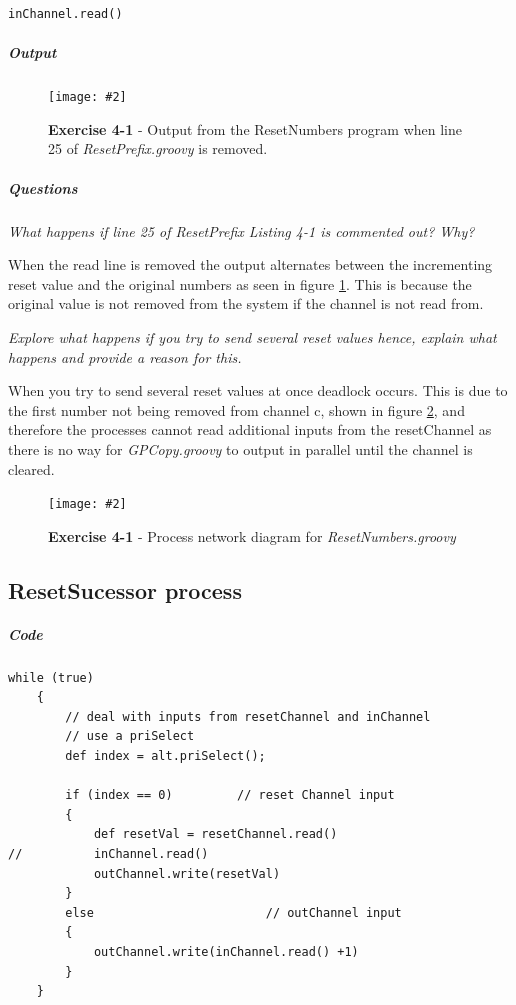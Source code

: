 \documentclass[10pt, a4paper]{article}
\newcommand{\figuremacro}[5]{
    \begin{figure}[#1]
        \centering
        \texttt{[image: \#2]}
        \caption[#3]{\textbf{#3}#4}
        \label{fig:#2}
    \end{figure}
}
\begin{document}
	\begin{lstlisting}[caption = "Line 25 of ResetPrefix.groovy"]
		inChannel.read()	\end{lstlisting}
		
	\subparagraph{Output} \hfill
	
	\figuremacro{H}{resetNum}{Exercise 4-1}{ - Output from the ResetNumbers program when line 25 of \textit{ResetPrefix.groovy} is removed.}{0.5}
	
	\subparagraph{Questions} \hfill
	
	\textit{What happens if line {25} of ResetPrefix Listing 4-1 is commented out? Why?}
	
	When the read line is removed the output alternates between the incrementing reset value and the original numbers as seen in figure \ref{fig:resetNum}. This is because the original value is not removed from the system if the channel is not read from.
		
	\textit{Explore what happens if you try to send several reset values hence, explain what happens and provide a reason for this.}
	
	When you try to send several reset values at once deadlock occurs. This is due to the first number not being removed from channel c, shown in figure \ref{fig:resetPre}, and therefore the processes cannot read additional inputs from the resetChannel as there is no way for \textit{GPCopy.groovy} to output in parallel until the channel is cleared.
	
	\figuremacro{H}{resetPre}{Exercise 4-1}{ - Process network diagram for \textit{ResetNumbers.groovy}}{0.7}
	
	\subsection{ResetSucessor process}

	\subparagraph{Code} \hfil
	
	
	\begin{lstlisting}[caption = "ResetSucessor.groovy"]
	while (true)
	{
		// deal with inputs from resetChannel and inChannel
		// use a priSelect
		def index = alt.priSelect();
		
		if (index == 0) 		// reset Channel input
		{
			def resetVal = resetChannel.read()
//			inChannel.read()
			outChannel.write(resetVal)
		}
		else						// outChannel input
		{
			outChannel.write(inChannel.read() +1)				
		}
	}	\end{lstlisting}
	
\end{document}
